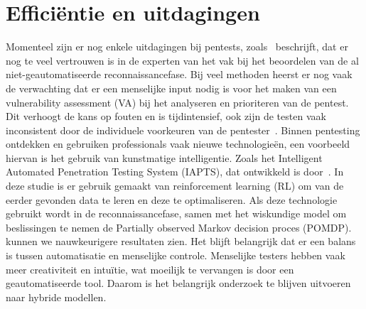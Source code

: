 \section{Efficiëntie en uitdagingen}
Momenteel zijn er nog enkele uitdagingen bij pentests, zoals~\textcite{Fugkeaw} beschrijft, dat er nog te veel vertrouwen is in de experten van het vak bij het beoordelen van de al niet-geautomatiseerde reconnaissancefase. 
Bij veel methoden heerst er nog vaak de verwachting dat er een menselijke input nodig is voor het maken van een vulnerability assessment (VA) bij het analyseren en prioriteren van de pentest. 
Dit verhoogt de kans op fouten en is tijdintensief, ook zijn de testen vaak inconsistent door de individuele voorkeuren van de pentester~\autocite{Shah2015}. 
Binnen pentesting ontdekken en gebruiken professionals vaak nieuwe technologieën, een voorbeeld hiervan is het gebruik van kunstmatige intelligentie. 
Zoals het Intelligent Automated Penetration Testing System (IAPTS), dat ontwikkeld is door~\textcite{Ghanem}. In deze studie is er gebruik gemaakt van reinforcement learning (RL) om van de eerder gevonden data te leren en deze te optimaliseren. 
Als deze technologie gebruikt wordt in de reconnaissancefase, samen met het wiskundige model om beslissingen te nemen de Partially observed Markov decision proces (POMDP). kunnen we nauwkeurigere resultaten zien. Het blijft belangrijk dat er een balans is tussen automatisatie en menselijke controle. 
Menselijke testers hebben vaak meer creativiteit en intuïtie, wat moeilijk te vervangen is door een geautomatiseerde tool. Daarom is het belangrijk onderzoek te blijven uitvoeren naar hybride modellen.





